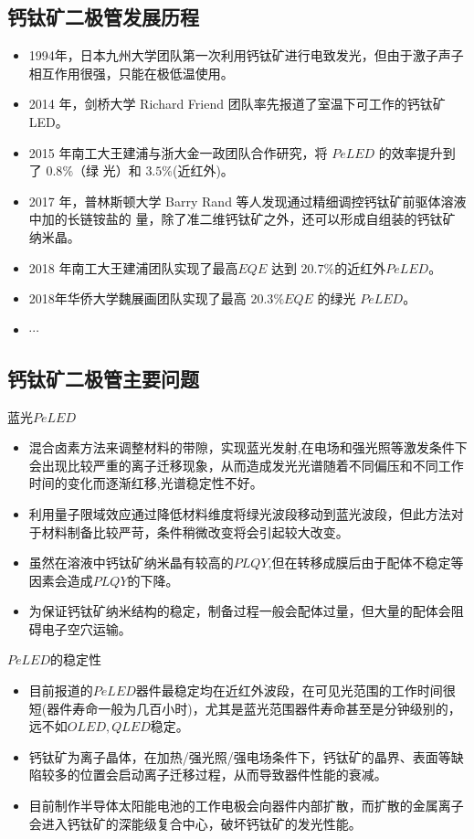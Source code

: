 \documentclass{beamer}[fontset=windows]
\begin{document}
\subsection{钙钛矿二极管发展历程}
\begin{itemize}
	\item 1994年，日本九州大学团队第一次利用钙钛矿进行电致发光，但由于激子声子相互作用很强，只能在极低温使用。
	\item 2014 年，剑桥大学 Richard Friend 团队率先报道了室温下可工作的钙钛矿 LED。
	\item 2015 年南工大王建浦与浙大金一政团队合作研究，将 $PeLED$ 的效率提升到了 $0.8\%$（绿
	光）和 $3.5\%$(近红外)。
	\item 2017 年，普林斯顿大学 Barry Rand 等人发现通过精细调控钙钛矿前驱体溶液中加的长链铵盐的
	量，除了准二维钙钛矿之外，还可以形成自组装的钙钛矿纳米晶。
	\item 2018 年南工大王建浦团队实现了最高$ EQE$ 达到 $20.7\%$的近红外$PeLED$。
	\item 2018年华侨大学魏展画团队实现了最高 $20.3\%EQE$ 的绿光 $PeLED$。
	\item $\cdots$
\end{itemize}
\subsection{钙钛矿二极管主要问题}
\begin{frame}
	\begin{block}{蓝光$PeLED$}
		\begin{itemize}
			\item 混合卤素方法来调整材料的带隙，实现蓝光发射,在电场和强光照等激发条件下会出现比较严重的离子迁移现象，从而造成发光光谱随着不同偏压和不同工作时间的变化而逐渐红移,光谱稳定性不好。
			\item 利用量子限域效应通过降低材料维度将绿光波段移动到蓝光波段，但此方法对于材料制备比较严苛，条件稍微改变将会引起较大改变。
			\item 虽然在溶液中钙钛矿纳米晶有较高的$PLQY$,但在转移成膜后由于配体不稳定等因素会造成$PLQY$的下降。
			\item 为保证钙钛矿纳米结构的稳定，制备过程一般会配体过量，但大量的配体会阻碍电子空穴运输。
		\end{itemize}
	\end{block}
\end{frame}
\begin{frame}
	\begin{block}{$PeLED$的稳定性}
		\begin{itemize}
			\item 目前报道的$PeLED$器件最稳定均在近红外波段，在可见光范围的工作时间很短(器件寿命一般为几百小时)，尤其是蓝光范围器件寿命甚至是分钟级别的，远不如$OLED,QLED$稳定。
			\item 钙钛矿为离子晶体，在加热/强光照/强电场条件下，钙钛矿的晶界、表面等缺陷较多的位置会启动离子迁移过程，从而导致器件性能的衰减。
			\item 目前制作半导体太阳能电池的工作电极会向器件内部扩散，而扩散的金属离子会进入钙钛矿的深能级复合中心，破坏钙钛矿的发光性能。
		\end{itemize}
	\end{block}
\end{frame}
\end{document}
